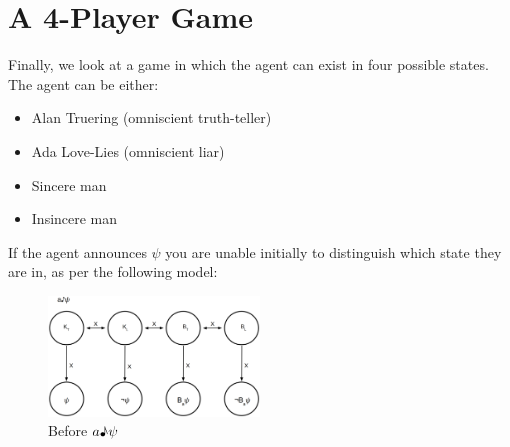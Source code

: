 \documentclass[12pt, titlepage, twoside, a4paper]{report}
\begin{document}
{\section{A 4-Player Game}
Finally, we look at a game in which the agent can exist in four possible states. The agent can be either:
\begin{itemize}
\item Alan Truering (omniscient truth-teller)
\item Ada Love-Lies (omniscient liar)
\item Sincere man
\item Insincere man
\end{itemize}
If the agent announces $\psi$ you are unable initially to distinguish which state they are in, as per the following model:
\begin{figure}[h!]
  \centering
  \includegraphics[width=0.5\textwidth]{slide40.eps}
  \caption{Before $a \text{\textmusicalnote} \psi$}
\end{figure}

}
\end{document}
